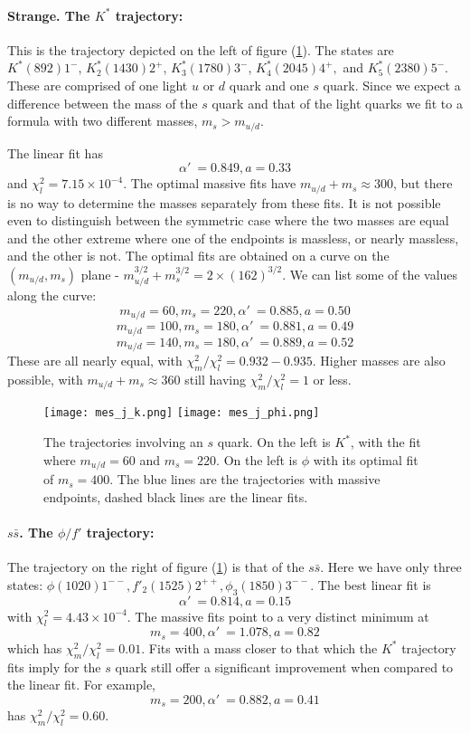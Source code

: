 \documentclass[11pt,a4]{article}
\newcommand{\alp}{\ensuremath{\alpha'\:}}
\newcommand{\ssb}{s\bar{s}}
\newcommand{\rchi}[1]{\ensuremath{\chi^2_m/\chi^2_l = #1}}
\newcommand{\ten}[1]{\times10^{#1}}
\newcommand{\mud}{m_{u/d}}
\begin{document}
				\paragraph{Strange. The \(K^*\) trajectory:} This is the trajectory depicted on the left of figure (\ref{fig:k_phi}). The states are \(K^*(892)1^-\), \(K^*_2(1430)2^+\), \(K^*_3(1780)3^-\), \(K^*_4(2045)4^+,\) and \(K^*_5(2380)5^-\). These are comprised of one light \(u\) or \(d\) quark and one \(s\) quark. Since we expect a difference between the mass of the \(s\) quark and that of the light quarks we fit to a formula with two different masses, \(m_s > m_{u/d}\).
				
				The linear fit has
				\[ \alp = 0.849, a = 0.33 \]
				and \(\chi^2_l = 7.15\ten{-4}\). The optimal massive fits have \(m_{u/d} + m_s \approx 300\), but there is no way to determine the masses separately from these fits. It is not possible even to distinguish between the symmetric case where the two masses are equal and the other extreme where one of the endpoints is massless, or nearly massless, and the other is not. The optimal fits are obtained on a curve on the \((m_{u/d},m_s)\) plane - \(\mud^{3/2}+m_s^{3/2} = 2\times(162)^{3/2}\). We can list some of the values along the curve:
				\[m_{u/d} = 60, m_s = 220, \alp = 0.885, a = 0.50\]
				\[m_{u/d} = 100, m_s = 180, \alp = 0.881, a = 0.49\]
				\[m_{u/d} = 140, m_s = 180, \alp = 0.889, a = 0.52\]
				These are all nearly equal, with \rchi{0.932-0.935}. Higher masses are also possible, with \(\mud + m_s \approx 360\) still having \rchi{1} or less.
				
\begin{figure}[tbp] \centering
						\texttt{[image: mes\_j\_k.png]}	 \hfill
						\texttt{[image: mes\_j\_phi.png]}
						\caption{\label{fig:k_phi} The trajectories involving an \(s\) quark. On the left is \(K^*\), with the fit where \(m_{u/d} = 60\) and \(m_s = 220\). On the left is \(\phi\) with its optimal fit of \(m_s = 400\). The blue lines are the trajectories with massive endpoints, dashed black lines are the linear fits.}
				\end{figure}
				
				\paragraph{\(\ssb\). The \(\phi/f'\) trajectory:} The trajectory on the right of figure (\ref{fig:k_phi}) is that of the \(\ssb\). Here we have only three states: \(\phi(1020)1^{--}, f'_2(1525)2^{++}, \phi_3(1850)3^{--}\). The best linear fit is
				\[ \alp = 0.814, a = 0.15 \]
				with \(\chi^2_l = 4.43\ten{-4}\). The massive fits point to a very distinct minimum at
				\[ m_s = 400, \alp = 1.078, a = 0.82 \]
				which has \rchi{0.01}. Fits with a mass closer to that which the \(K^*\) trajectory fits imply for the \(s\) quark still offer a significant improvement when compared to the linear fit. For example,
				\[ m_s = 200, \alp = 0.882, a = 0.41 \]
				has \rchi{0.60}.
				
\end{document}
